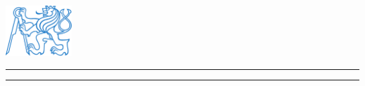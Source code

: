 \begin{center}

    \includegraphics[width=25mm]{img/lev}

    \vspace{3mm}

    \hugetitle{\University \par }
    {\color{logocolor}\rule[.5ex]{\linewidth}{1pt}}\par
    \LARGEtitle{\Faculty \par }
    \Largetitle{\Department\par }

\end{center}

\vspace{\fill}\par

\begin{center}
    \hugetitle{\bf \Title \par }
    \vspace{5mm}
    \LARGEtitle{\Subject \par }
    \vspace{15mm}
    \Largetitle{\bf \AuthorName \par }
\end{center}


\vspace{\fill}\par

\begin{description}
    \item [] \noindent \normaltitle{\Programme} \par
    \item [] \noindent \normaltitle{\Specialisation} \par
    \item [] \noindent \normaltitle{\SupervisorName} \par
\end{description}

\vspace{5mm}


\begin{center}
    {\color{logocolor}\rule[.5ex]{\linewidth}{1pt}}\par
    \LARGEtitle{\IssuedIn, \the\year \par}
\end{center}
